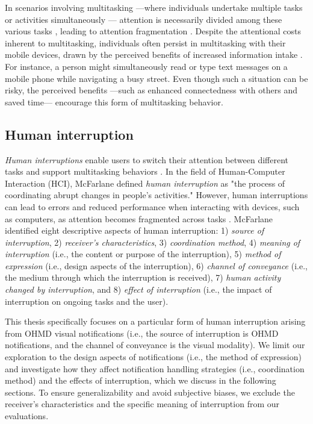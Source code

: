 In scenarios involving multitasking ---where individuals undertake multiple tasks or activities simultaneously \cite{spink2008multitasking, gonzalez_constant_2004}--- attention is necessarily divided among these various tasks \cite{wickens_processing_1991, oulasvirta_interaction_2005}, leading to attention fragmentation \cite{oulasvirta_interaction_2005}. Despite the attentional costs inherent to multitasking, individuals often persist in multitasking with their mobile devices, drawn by the perceived benefits of increased information intake \cite{wang2012myth, paridon2010multitasking}. For instance, a person might simultaneously read or type text messages on a mobile phone while navigating a busy street. Even though such a situation can be risky, the perceived benefits ---such as enhanced connectedness with others and saved time--- encourage this form of multitasking behavior.

\subsection{Human interruption}
\label{sec:Relatedwork:interruption}

\textit{Human interruptions} enable users to switch their attention between different tasks and support multitasking behaviors \cite{norman_psychological_1986}. In the field of Human-Computer Interaction (HCI), McFarlane \cite{mcfarlane_scope_2002, mcfarlane_interruption_1997} defined \textit{human interruption} as "the process of coordinating abrupt changes in people's activities." However, human interruptions can lead to errors and reduced performance when interacting with devices, such as computers, as attention becomes fragmented across tasks \cite{bailey_effects_2001, bailey_need_2006, adamczyk_if_2004}. McFarlane \cite{mcfarlane_interruption_1997} identified eight descriptive aspects of human interruption: 1) \textit{source of interruption}, 2) \textit{receiver's characteristics}, 3) \textit{coordination method}, 4) \textit{meaning of interruption} (i.e., the content or purpose of the interruption), 5) \textit{method of expression} (i.e., design aspects of the interruption), 6) \textit{channel of conveyance} (i.e., the medium through which the interruption is received), 7) \textit{human activity changed by interruption}, and 8) \textit{effect of interruption} (i.e., the impact of interruption on ongoing tasks and the user).


This thesis specifically focuses on a particular form of human interruption arising from OHMD visual notifications (i.e., the source of interruption is OHMD notifications, and the channel of conveyance is the visual modality). We limit our exploration to the design aspects of notifications (i.e., the method of expression) and investigate how they affect notification handling strategies (i.e., coordination method) and the effects of interruption, which we discuss in the following sections. To ensure generalizability and avoid subjective biases, we exclude the receiver's characteristics and the specific meaning of interruption from our evaluations.


